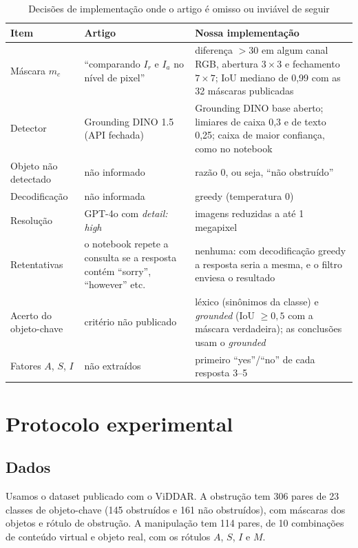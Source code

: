 \documentclass[journal,onecolumn]{IEEEtran}
\newcommand{\Ir}{I_r}
\newcommand{\Ia}{I_a}
\begin{document}
\begin{table}[!t]
\renewcommand{\arraystretch}{1.2}
\caption{Decisões de implementação onde o artigo é omisso ou inviável de seguir}
\label{tab:decisoes}
\centering
\footnotesize
\begin{tabular}{L{3.6cm}L{4.6cm}L{7.0cm}}
\toprule
Item & Artigo & Nossa implementação \\
\midrule
Máscara $m_c$ & ``comparando $\Ir$ e $\Ia$ no nível de pixel'' & diferença $>30$ em algum canal RGB, abertura $3\times3$ e fechamento $7\times7$; IoU mediano de 0,99 com as 32 máscaras publicadas \\
Detector & Grounding DINO 1.5 (API fechada) & Grounding DINO base aberto; limiares de caixa 0,3 e de texto 0,25; caixa de maior confiança, como no notebook \\
Objeto não detectado & não informado & razão 0, ou seja, ``não obstruído'' \\
Decodificação & não informada & greedy (temperatura 0) \\
Resolução & GPT-4o com \emph{detail: high} & imagens reduzidas a até 1 megapixel \\
Retentativas & o notebook repete a consulta se a resposta contém ``sorry'', ``however'' etc. & nenhuma: com decodificação greedy a resposta seria a mesma, e o filtro enviesa o resultado \\
Acerto do objeto-chave & critério não publicado & léxico (sinônimos da classe) e \emph{grounded} (IoU $\geq 0{,}5$ com a máscara verdadeira); as conclusões usam o \emph{grounded} \\
Fatores $A$, $S$, $I$ & não extraídos & primeiro ``yes''/``no'' de cada resposta 3--5 \\
\bottomrule
\end{tabular}
\end{table}

\section{Protocolo experimental}
\label{sec:protocolo}

\subsection{Dados}
Usamos o dataset publicado com o ViDDAR. A obstrução tem 306 pares de 23 classes de objeto-chave (145
obstruídos e 161 não obstruídos), com máscaras dos objetos e rótulo de obstrução. A manipulação tem 114
pares, de 10 combinações de conteúdo virtual e objeto real, com os rótulos $A$, $S$, $I$ e $M$.
\end{document}
